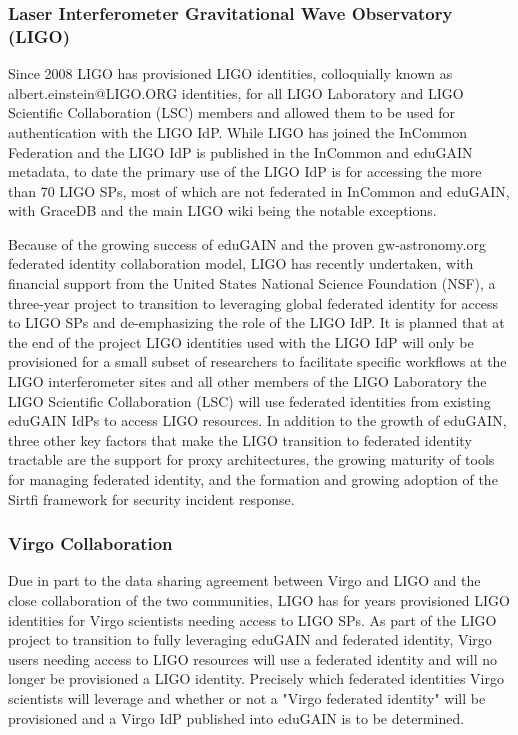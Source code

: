 \documentclass[fleqn,11pt]{wlscirep}
\begin{document}
{\subsubsection{Laser Interferometer Gravitational Wave Observatory (LIGO)}
Since 2008 LIGO has provisioned LIGO identities, colloquially known as albert.einstein@LIGO.ORG identities, for all LIGO Laboratory and LIGO Scientific Collaboration (LSC) members and allowed them to be used for authentication with the LIGO IdP. While LIGO has joined the InCommon Federation and the LIGO IdP is published in the InCommon and eduGAIN metadata, to date the primary use of the LIGO IdP is for accessing the more than 70 LIGO SPs, most of which are not federated in InCommon and eduGAIN, with GraceDB and the main LIGO wiki being the notable exceptions.

Because of the growing success of eduGAIN and the proven gw-astronomy.org federated identity collaboration model, LIGO has recently undertaken, with financial support from the United States National Science Foundation (NSF), a three-year project to transition to leveraging global federated identity for access to LIGO SPs and de-emphasizing the role of the LIGO IdP. It is planned that at the end of the project LIGO identities used with the LIGO IdP will only be provisioned for a small subset of researchers to facilitate specific workflows at the LIGO interferometer sites and all other members of the LIGO Laboratory the LIGO Scientific Collaboration (LSC) will use federated identities from existing eduGAIN IdPs to access LIGO resources. In addition to the growth of eduGAIN, three other key factors that make the LIGO transition to federated identity tractable are the support for proxy architectures, the growing maturity of tools for managing federated identity, and the formation and growing adoption of the Sirtfi framework for security incident response.


\subsubsection{Virgo Collaboration}
Due in part to the data sharing agreement between Virgo and LIGO and the close collaboration of the two communities, LIGO has for years provisioned LIGO identities for Virgo scientists needing access to LIGO SPs. As part of the LIGO project to transition to fully leveraging eduGAIN and federated identity, Virgo users needing access to LIGO resources will use a federated identity and will no longer be provisioned a LIGO identity. Precisely which federated identities Virgo scientists will leverage and whether or not a "Virgo federated identity" will be provisioned and a Virgo IdP published into eduGAIN is to be determined.


}
\end{document}
